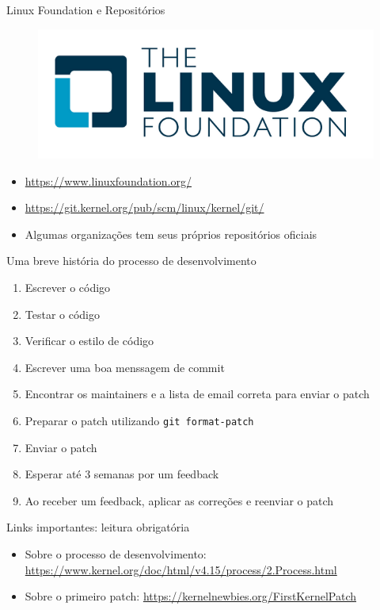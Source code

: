 \documentclass[10pt, compress, aspectratio=169]{beamer}
\begin{document}
\begin{frame}{Linux Foundation e Repositórios}

  \begin{figure}
    \centering
    \includegraphics[width=\linewidth,
                     height=0.3\textheight,
                     keepaspectratio]{linux-foundation}
  \end{figure}

  \begin{itemize}
    \item \url{https://www.linuxfoundation.org/}
    \item \url{https://git.kernel.org/pub/scm/linux/kernel/git/}
    \item Algumas organizações tem seus próprios repositórios oficiais
  \end{itemize}

\end{frame}

\begin{frame}{Uma breve história do processo de desenvolvimento}

  \begin{enumerate}
    \item Escrever o código
    \item Testar o código
    \item Verificar o estilo de código
    \item Escrever uma boa menssagem de commit
    \item Encontrar os maintainers e a lista de email correta para enviar
          o patch
    \item Preparar o patch utilizando \texttt{git format-patch}
    \item Enviar o patch
    \item Esperar até 3 semanas por um feedback
    \item Ao receber um feedback, aplicar as correções e reenviar o patch
  \end{enumerate}

  \begin{exampleblock}{Links importantes: leitura obrigatória}
    \begin{itemize}
      \item Sobre o processo de desenvolvimento: \url{https://www.kernel.org/doc/html/v4.15/process/2.Process.html}
      \item Sobre o primeiro patch: \url{https://kernelnewbies.org/FirstKernelPatch}
    \end{itemize}
  \end{exampleblock}

\end{frame}
\end{document}
